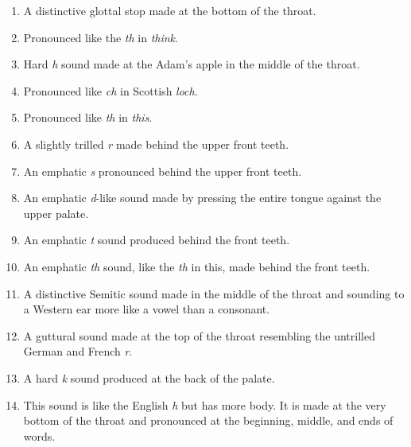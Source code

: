 \documentclass[oneside,ebook]{memoir}
\begin{document}
\vspace{-0.95em}
\begin{small}
\begin{enumerate}[leftmargin=*]
\setlength\itemsep{-0.2em}
\item A distinctive glottal stop made at the bottom of the throat.
\item Pronounced like the \textit{th} in \textit{think}.
\item Hard \textit{h} sound made at the Adam’s apple in the middle of the throat.
\item Pronounced like \textit{ch} in Scottish \textit{loch}.
\item Pronounced like \textit{th} in \textit{this}.
\item A slightly trilled \textit{r} made behind the upper front teeth.
\item An emphatic \textit{s} pronounced behind the upper front teeth.
\item An emphatic \textit{d}-like sound made by pressing the entire tongue against the upper palate.
\item An emphatic \textit{t} sound produced behind the front teeth.
\item An emphatic \textit{th} sound, like the \textit{th} in this, made behind the front teeth.
\item A distinctive Semitic sound made in the middle of the throat and sounding to a Western ear more like a vowel than a consonant.
\item A guttural sound made at the top of the throat resembling the untrilled German and French \textit{r}.
\item A hard \textit{k} sound produced at the back of the palate.
\item This sound is like the English \textit{h} but has more body. It is made at the very bottom of the throat and pronounced at the beginning, middle, and ends of words.
\end{enumerate}
\end{small}
\end{document}
